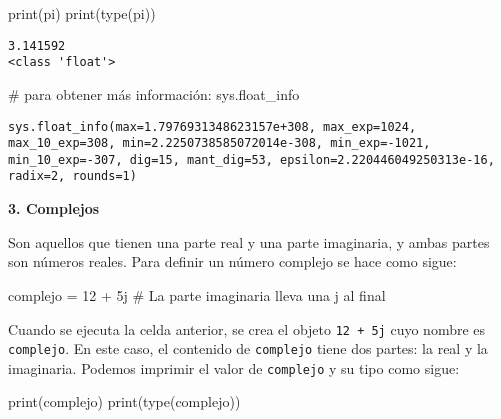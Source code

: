 \documentclass[
  letterpaper,
  DIV=11,
  numbers=noendperiod]{scrreprt}
\newenvironment{Shaded}{\begin{snugshade}}{\end{snugshade}}
\newcommand{\BuiltInTok}[1]{\textcolor[rgb]{0.00,0.23,0.31}{#1}}
\newcommand{\CommentTok}[1]{\textcolor[rgb]{0.37,0.37,0.37}{#1}}
\newcommand{\DecValTok}[1]{\textcolor[rgb]{0.68,0.00,0.00}{#1}}
\newcommand{\NormalTok}[1]{\textcolor[rgb]{0.00,0.23,0.31}{#1}}
\newcommand{\OperatorTok}[1]{\textcolor[rgb]{0.37,0.37,0.37}{#1}}
\newcommand{\OtherTok}[1]{\textcolor[rgb]{0.00,0.23,0.31}{#1}}
\begin{document}
\begin{Shaded}
\begin{Highlighting}[]
\BuiltInTok{print}\NormalTok{(pi)}
\BuiltInTok{print}\NormalTok{(}\BuiltInTok{type}\NormalTok{(pi))}
\end{Highlighting}
\end{Shaded}

\begin{verbatim}
3.141592
<class 'float'>
\end{verbatim}

\begin{Shaded}
\begin{Highlighting}[]
\CommentTok{\# para obtener más información:}
\NormalTok{sys.float\_info}
\end{Highlighting}
\end{Shaded}

\begin{verbatim}
sys.float_info(max=1.7976931348623157e+308, max_exp=1024, max_10_exp=308, min=2.2250738585072014e-308, min_exp=-1021, min_10_exp=-307, dig=15, mant_dig=53, epsilon=2.220446049250313e-16, radix=2, rounds=1)
\end{verbatim}

\textbf{3. Complejos}

Son aquellos que tienen una parte real y una parte imaginaria, y ambas
partes son números reales. Para definir un número complejo se hace como
sigue:

\begin{Shaded}
\begin{Highlighting}[]
\NormalTok{complejo }\OperatorTok{=} \DecValTok{12} \OperatorTok{+} \OtherTok{5j} \CommentTok{\# La parte imaginaria lleva una j al final}
\end{Highlighting}
\end{Shaded}

Cuando se ejecuta la celda anterior, se crea el objeto
\texttt{12\ +\ 5j} cuyo nombre es \texttt{complejo}. En este caso, el
contenido de \texttt{complejo} tiene dos partes: la real y la
imaginaria. Podemos imprimir el valor de \texttt{complejo} y su tipo
como sigue:

\begin{Shaded}
\begin{Highlighting}[]
\BuiltInTok{print}\NormalTok{(complejo)}
\BuiltInTok{print}\NormalTok{(}\BuiltInTok{type}\NormalTok{(complejo))}
\end{Highlighting}
\end{Shaded}
\end{document}
